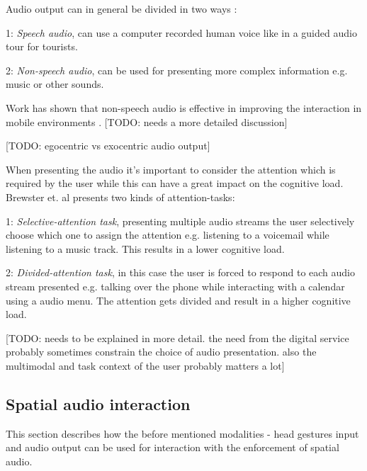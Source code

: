 Audio output can in general be divided in two ways \cite{rocchesso_sounding_2003}:
\begin{description}
\item{1: \textit{Speech audio}}, can use a computer recorded human voice like in a guided audio tour for tourists.
\item{2: \textit{Non-speech audio}}, can be used for presenting more complex information e.g. music or other sounds.
\end{description}

Work has shown that non-speech audio is effective in improving the interaction in mobile environments \cite{pirhonen_gestural_2002, sawhney_nomadic_2000}. [TODO: needs a more detailed discussion]

[TODO: egocentric vs exocentric audio output]

When presenting the audio it's important to consider the attention which is required by the user while this can have a great impact on the cognitive load. Brewster et. al \cite{vazquez-alvarez_eyes-free_2011} presents two kinds of attention-tasks:

\begin{description}
\item{1: \textit{Selective-attention task}}, presenting multiple audio streams the user selectively choose which one to assign the attention e.g. listening to a voicemail while listening to a music track. This results in a lower cognitive load.

\item{2: \textit{Divided-attention task}}, in this case the user is forced to respond to each audio stream presented e.g. talking over the phone while interacting with a calendar using a audio menu. The attention gets divided and result in a higher cognitive load.
\end{description}

[TODO: needs to be explained in more detail. the need from the digital service probably sometimes constrain the choice of audio presentation. also the multimodal and task context of the user probably matters a lot]


\subsection{Spatial audio interaction}
This section describes how the before mentioned modalities - head gestures input and audio output can be used for interaction with the enforcement of spatial audio.

